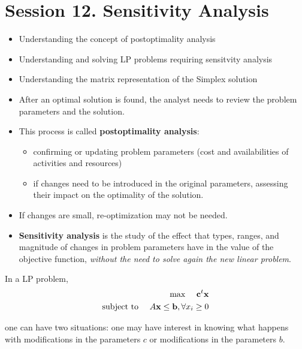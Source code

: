 
\section{Session 12. Sensitivity Analysis}

\begin{itemize}
  \item Understanding the concept of postoptimality analysis
  \item Understanding and solving LP problems requiring sensitvity analysis
  \item Understanding the matrix representation of the Simplex solution
\end{itemize}

\begin{itemize}
  \item After an optimal solution is found, the analyst needs to review the problem parameters and the solution.
  \item This process is called {\bf postoptimality analysis}:
  \begin{itemize}
    \item confirming or updating problem parameters (cost and availabilities of activities and resources)
    \item if changes need to be introduced in the original parameters, assessing their impact on the optimality of the solution.
  \end{itemize}
  \item If changes are small, re-optimization may not be needed.
  \item {\bf Sensitivity analysis} is the study of the effect that types, ranges, and magnitude of changes in problem parameters have in the value of the objective function, {\em without the need to solve again the new linear problem}.
\end{itemize}

  In a LP problem, 
\begin{eqnarray*}
 \text{max }\quad\textbf{c}^t \textbf{x}\\
 \text{subject to }\quad A\textbf{x}\leq \textbf{b}, \forall x_i\geq0
\end{eqnarray*}

one can have two situations: one may have interest in knowing what happens with modifications in the parameters $c$ or modifications in the parameters $b$.

